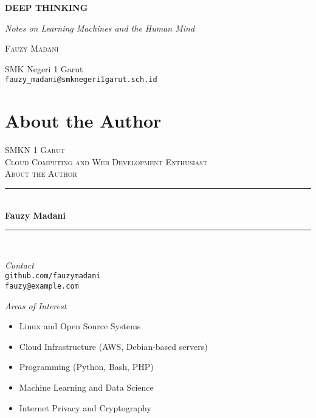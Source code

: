 \documentclass{book}
\begin{document}
\begin{titlepage}
\centering
\vspace*{3cm}
{\Huge\bfseries DEEP THINKING\par}
\vspace{0.5cm}
{\Large\itshape Notes on Learning Machines and the Human Mind\par}
\vspace{2cm}
{\LARGE\scshape Fauzy Madani\par}
\vfill
{\Large SMK Negeri 1 Garut \\ \texttt{fauzy\_madani@smknegeri1garut.sch.id}}
\vspace*{2cm}
\end{titlepage}

\chapter*{About the Author}

\vspace{2em}

\newcommand{\HRule}{\rule{\linewidth}{0.5mm}}

\begin{center}
  \textsc{\LARGE SMKN 1 Garut}\\[1.5cm] %
  
  \textsc{\Large Cloud Computing and Web Development Enthusiast}\\[0.5cm] %
  
  \textsc{\large About the Author}\\[0.5cm] %
  
  \HRule\\[0.4cm]
  
  {\huge\bfseries Fauzy Madani}\\[0.4cm] %
  
  \HRule\\[1.5cm]
\end{center}

\noindent
\begin{minipage}{0.48\textwidth}
  \large
  \textit{Contact}\\
  \texttt{github.com/fauzymadani} \\
  \texttt{fauzy@example.com}
\end{minipage}
\hfill
\begin{minipage}{0.48\textwidth}
  \large
  \textit{Areas of Interest}\\
  \begin{itemize}
    \setlength\itemsep{0.6em}
    \item Linux and Open Source Systems
    \item Cloud Infrastructure (AWS, Debian-based servers)
    \item Programming (Python, Bash, PHP)
    \item Machine Learning and Data Science
    \item Internet Privacy and Cryptography
  \end{itemize}
\end{minipage}
\end{document}
